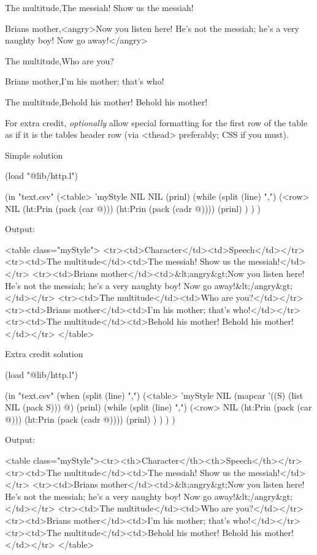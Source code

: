 The multitude,The messiah! Show us the messiah!

Brians mother,\textless{}angry\textgreater{}Now you listen here! He's
not the messiah; he's a very naughty boy! Now go
away!\textless{}/angry\textgreater{}

The multitude,Who are you?

Brians mother,I'm his mother; that's who!

The multitude,Behold his mother! Behold his mother!

For extra credit, \emph{optionally} allow special formatting for the
first row of the table as if it is the tables header row (via
\textless{}thead\textgreater{} preferably; CSS if you must).



\begin{wideverbatim}

Simple solution

(load "@lib/http.l")

(in "text.csv"
   (<table> 'myStyle NIL NIL
      (prinl)
      (while (split (line) ",")
         (<row> NIL (ht:Prin (pack (car @))) (ht:Prin (pack (cadr @))))
         (prinl) ) ) )

Output:

<table class="myStyle">
<tr><td>Character</td><td>Speech</td></tr>
<tr><td>The multitude</td><td>The messiah! Show us the messiah!</td></tr>
<tr><td>Brians mother</td><td>\&lt;angry\&gt;Now you listen here! 
He's not the messiah; he's a very naughty boy! Now go away!\&lt;/angry\&gt;</td></tr>
<tr><td>The multitude</td><td>Who are you?</td></tr>
<tr><td>Brians mother</td><td>I'm his mother; that's who!</td></tr>
<tr><td>The multitude</td><td>Behold his mother! Behold his mother!</td></tr>
</table>

Extra credit solution

(load "@lib/http.l")

(in "text.csv"
   (when (split (line) ",")
      (<table> 'myStyle NIL (mapcar '((S) (list NIL (pack S))) @)
         (prinl)
         (while (split (line) ",")
            (<row> NIL (ht:Prin (pack (car @))) (ht:Prin (pack (cadr @))))
            (prinl) ) ) ) )

Output:

<table class="myStyle"><tr><th>Character</th><th>Speech</th></tr>
<tr><td>The multitude</td><td>The messiah! Show us the messiah!</td></tr>
<tr><td>Brians mother</td><td>\&lt;angry\&gt;Now you listen here! 
He's not the messiah; he's a very naughty boy! Now go away!\&lt;/angry\&gt;</td></tr>
<tr><td>The multitude</td><td>Who are you?</td></tr>
<tr><td>Brians mother</td><td>I'm his mother; that's who!</td></tr>
<tr><td>The multitude</td><td>Behold his mother! Behold his mother!</td></tr>
</table>

\end{wideverbatim}


% 
